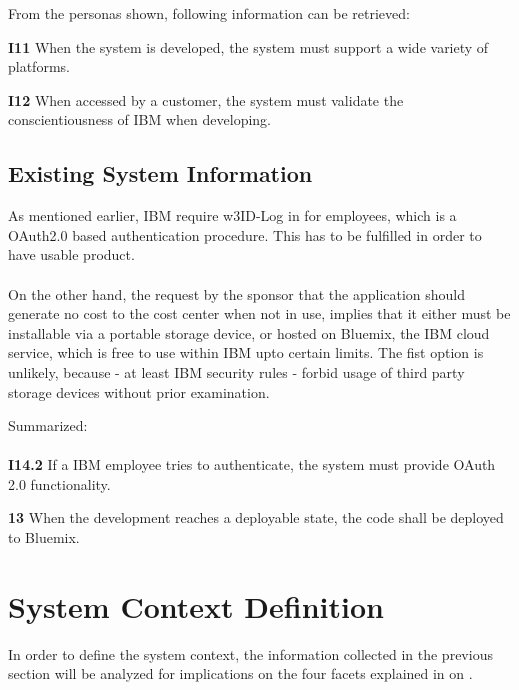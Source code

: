 From the personas shown, following information can be retrieved:

\begin{closeItem}
    \item [\textbf{I11}] When the system is developed, the system must support a wide variety of platforms.
    \item [\textbf{I12}] When accessed by a customer, the system must validate the conscientiousness of IBM when developing.
\end{closeItem}

\subsection{Existing System Information}
As mentioned earlier, IBM require w3ID-Log in for employees, which is a OAuth2.0 \parencite[cf.][]{InternetEngineeringTaskForce.2012} based authentication procedure. This has to be fulfilled in order to have  usable product. 

\paragraph{} On the other hand, the request by the sponsor that the application should generate no cost to the cost center when not in use, implies that it either must be installable via a portable storage device, or hosted on Bluemix, the IBM cloud service, which is free to use within IBM upto certain limits. The fist option is unlikely, because - at least IBM security rules - forbid usage of third party storage devices without prior examination.

Summarized: 

\paragraph{}
\begin{closeItem}
\item [\textbf{I14.2}] If a IBM employee tries to authenticate, the system must provide OAuth 2.0 functionality. 
\item[\textbf{13}] When the development reaches a deployable state, the code shall be deployed to Bluemix.
\end{closeItem}
\section{System Context Definition}
In order to define the system context, the information collected in the previous section will be analyzed for implications on the four facets explained in \Cref{} on \cpagerefrange{}{}.

